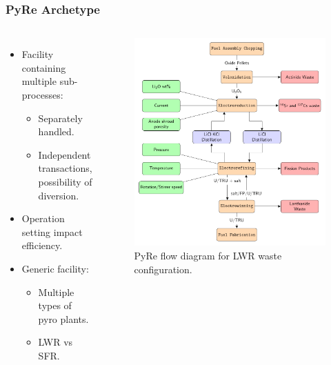 \begin{frame}
	\frametitle{PyRe Archetype}
	\begin{columns}
		\column[t]{5cm}
		\begin{itemize}
			\item Facility containing multiple sub-processes:
			\begin{itemize}
				\item Separately handled.
				\item Independent transactions, possibility of diversion.
			\end{itemize}
			\item Operation setting impact efficiency.
			\item Generic facility:
			\begin{itemize}
				\item Multiple types of pyro plants.
				\item LWR vs SFR.
			\end{itemize}
		\end{itemize}
		\column[t]{6cm}
		\begin{figure}
			\includegraphics[width=\linewidth]{./images/westphal-pyre.pdf}
			\caption{PyRe flow diagram for LWR waste configuration.}
			\label{fig:pyre}
		\end{figure}
	\end{columns}
\end{frame}

